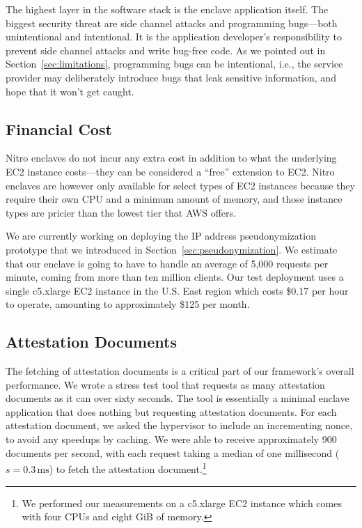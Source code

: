The highest layer in the software stack is the enclave application itself.  The
biggest security threat are side channel attacks and programming bugs---both
unintentional and intentional.  It is the application developer's responsibility
to prevent side channel attacks and write bug-free code.  As we pointed out in
Section~\ref{sec:limitations}, programming bugs can be intentional, i.e., the
service provider may deliberately introduce bugs that leak sensitive
information, and hope that it won't get caught.

\subsection{Financial Cost}
\label{sec:cost}

Nitro enclaves do not incur any extra cost in addition to what the underlying
EC2 instance costs---they can be considered a ``free'' extension to EC2.  Nitro
enclaves are however only available for select types of EC2 instances because
they require their own CPU and a minimum amount of memory, and those instance
types are pricier than the lowest tier that AWS offers.


We are currently working on deploying the IP address pseudonymization prototype
that we introduced in Section~\ref{sec:pseudonymization}.  We estimate that our
enclave is going to have to handle an average of 5,000 requests per minute,
coming from more than ten million clients.  Our test deployment uses a single c5.xlarge
EC2 instance in the U.S. East region which costs \$0.17 per hour to operate,
amounting to approximately \$125 per month.

\subsection{Attestation Documents}
\label{sec:attestation-performance}

The fetching of attestation documents is a critical part of our framework's
overall performance.  We wrote a stress test tool that requests as many
attestation documents as it can over sixty seconds.  The tool is essentially a
minimal enclave application that does nothing but requesting attestation
documents.  For each attestation document, we asked the hypervisor to include
an incrementing nonce, to avoid any speedups by caching.  We were able to
receive approximately 900 documents per second, with each request taking a
median of one millisecond ($s = 0.3\,\text{ms}$) to fetch the attestation
document.\footnote{We performed our measurements on a c5.xlarge EC2 instance
which comes with four CPUs and eight GiB of memory.}

